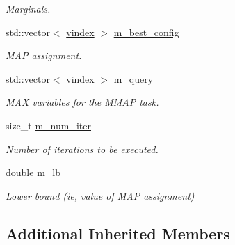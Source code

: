 \begin{DoxyCompactItemize}
\begin{DoxyCompactList}\small\item\em Marginals. \end{DoxyCompactList}\item 
std\+::vector$<$ \hyperlink{classmerlin_1_1wmb_ab942720d1c65e0002674af4eeade660f}{vindex} $>$ \hyperlink{classmerlin_1_1wmb_a0f74574e4a8fe116fb2c8cac3133285c}{m\+\_\+best\+\_\+config}\hypertarget{classmerlin_1_1wmb_a0f74574e4a8fe116fb2c8cac3133285c}{}\label{classmerlin_1_1wmb_a0f74574e4a8fe116fb2c8cac3133285c}

\begin{DoxyCompactList}\small\item\em M\+AP assignment. \end{DoxyCompactList}\item 
std\+::vector$<$ \hyperlink{classmerlin_1_1wmb_ab942720d1c65e0002674af4eeade660f}{vindex} $>$ \hyperlink{classmerlin_1_1wmb_a371fef243f301501c4c4ab66110d6e4f}{m\+\_\+query}\hypertarget{classmerlin_1_1wmb_a371fef243f301501c4c4ab66110d6e4f}{}\label{classmerlin_1_1wmb_a371fef243f301501c4c4ab66110d6e4f}

\begin{DoxyCompactList}\small\item\em M\+AX variables for the M\+M\+AP task. \end{DoxyCompactList}\item 
size\+\_\+t \hyperlink{classmerlin_1_1wmb_a743ab793f808e44b021f7e811df3521b}{m\+\_\+num\+\_\+iter}\hypertarget{classmerlin_1_1wmb_a743ab793f808e44b021f7e811df3521b}{}\label{classmerlin_1_1wmb_a743ab793f808e44b021f7e811df3521b}

\begin{DoxyCompactList}\small\item\em Number of iterations to be executed. \end{DoxyCompactList}\item 
double \hyperlink{classmerlin_1_1wmb_a68bc2a7e87eeab1021bf1877a3b200c6}{m\+\_\+lb}\hypertarget{classmerlin_1_1wmb_a68bc2a7e87eeab1021bf1877a3b200c6}{}\label{classmerlin_1_1wmb_a68bc2a7e87eeab1021bf1877a3b200c6}

\begin{DoxyCompactList}\small\item\em Lower bound (ie, value of M\+AP assignment) \end{DoxyCompactList}\end{DoxyCompactItemize}
\subsection*{Additional Inherited Members}


